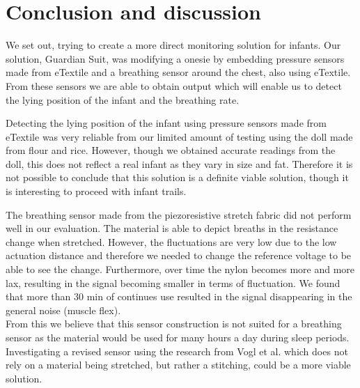 \documentclass{sigchi-ext}
\begin{document}
\section{Conclusion and discussion}
We set out, trying to create a more direct monitoring solution for infants. Our solution, Guardian Suit, was 
modifying a onesie by embedding pressure sensors made from eTextile and a breathing sensor around the
chest, also using eTextile. From these sensors we are able to obtain output which will enable us to 
detect the lying position of the infant and the breathing rate.

Detecting the lying position of the infant using pressure sensors made from eTextile was very reliable from our limited amount of 
testing using the doll made from flour and rice. However, though we obtained accurate readings from the doll, this does not 
reflect a real infant as they vary in size and fat. Therefore it is not possible to conclude that this solution is a definite viable
solution, though it is interesting to proceed with infant trails.

The breathing sensor made from the piezoresistive stretch fabric did not perform well in our evaluation. The material
is able to depict breaths in the resistance change when stretched. However, the fluctuations are very low due to the 
low actuation distance and therefore we needed to change the reference voltage to be able to see the change. Furthermore, 
over time the nylon becomes more and more lax, resulting in the signal
becoming smaller in terms of fluctuation. We found that more than 30 min of continues use resulted in the signal
disappearing in the general noise (muscle flex).\\
From this we believe that this sensor construction is not suited for a breathing sensor as the material would be
used for many hours a day during sleep periods. Investigating a revised sensor using the research from Vogl et al. \cite{stretcheband}
which does not rely on a material being stretched, but rather a stitching, could be a more viable solution.
\end{document}
